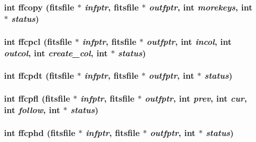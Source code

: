 \subsubsection{\setlength{\rightskip}{0pt plus 5cm}int ffcopy (\bf{fitsfile} $\ast$ {\em infptr}, \bf{fitsfile} $\ast$ {\em outfptr}, int {\em morekeys}, int $\ast$ {\em status})}\label{test_2shm__client_2fitsio_8h_05f351dc381335ac165c99c10791f85d}


\subsubsection{\setlength{\rightskip}{0pt plus 5cm}int ffcpcl (\bf{fitsfile} $\ast$ {\em infptr}, \bf{fitsfile} $\ast$ {\em outfptr}, int {\em incol}, int {\em outcol}, int {\em create\_\-col}, int $\ast$ {\em status})}\label{test_2shm__client_2fitsio_8h_c4005499502ddc26787bf95b711a56d5}


\subsubsection{\setlength{\rightskip}{0pt plus 5cm}int ffcpdt (\bf{fitsfile} $\ast$ {\em infptr}, \bf{fitsfile} $\ast$ {\em outfptr}, int $\ast$ {\em status})}\label{test_2shm__client_2fitsio_8h_065331889b563986ac9c35c5b2767397}


\subsubsection{\setlength{\rightskip}{0pt plus 5cm}int ffcpfl (\bf{fitsfile} $\ast$ {\em infptr}, \bf{fitsfile} $\ast$ {\em outfptr}, int {\em prev}, int {\em cur}, int {\em follow}, int $\ast$ {\em status})}\label{test_2shm__client_2fitsio_8h_6b5ccd7589659b89042159ad803ded15}


\subsubsection{\setlength{\rightskip}{0pt plus 5cm}int ffcphd (\bf{fitsfile} $\ast$ {\em infptr}, \bf{fitsfile} $\ast$ {\em outfptr}, int $\ast$ {\em status})}\label{test_2shm__client_2fitsio_8h_fa817efdc02282f5df1032b2d1b8dbaf}


